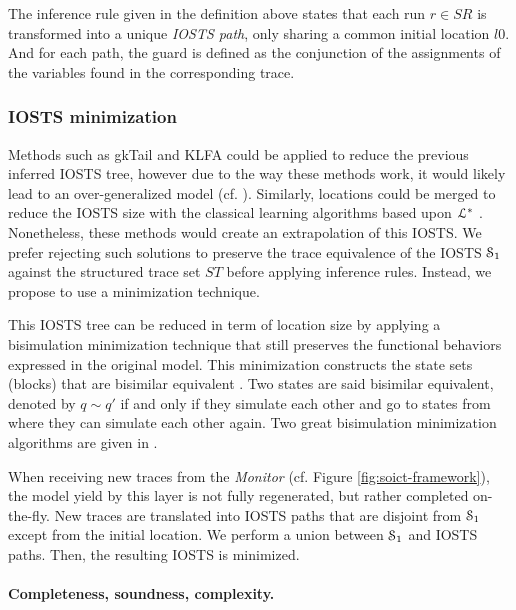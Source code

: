 The inference rule given in the definition above states that each
run $r \in SR$ is transformed into a unique \emph{IOSTS path},
only sharing a common initial location $l0$. And for each path,
the guard is defined as the conjunction of the assignments of the
variables found in the corresponding trace.

\subsubsection{IOSTS minimization}

Methods such as gkTail and KLFA could be applied to reduce the
previous inferred IOSTS tree, however due to the way these
methods work, it would likely lead to an over-generalized model
(cf. ).
Similarly, locations could be merged to reduce the IOSTS size
with the classical learning algorithms based upon
$\EuScript{L}^*$ \cite{Angluin198787,lambeau08}. Nonetheless,
these methods would create an extrapolation of this IOSTS. We
prefer rejecting such solutions to preserve the trace equivalence
\cite{petrenko06} of the IOSTS $\EuScript{S}_1$ against the
structured trace set $ST$ before applying inference rules.
Instead, we propose to use a minimization technique.

This IOSTS tree can be reduced in term of location size by
applying a bisimulation minimization technique that still
preserves the functional behaviors expressed in the original
model. This minimization constructs the state sets (blocks) that
are bisimilar equivalent \cite{Park:1981:CAI:647210.720030}. Two
states are said bisimilar equivalent, denoted by $q \sim q'$ if
and only if they simulate each other and go to states from where
they can simulate each other again.  Two great bisimulation
minimization algorithms are given in
\cite{Fernandez89animplementation,Abdulla06}.

When receiving new traces from the \emph{Monitor} (cf. Figure
\ref{fig:soict-framework}), the model yield by this layer is not
fully regenerated, but rather completed on-the-fly. New traces
are translated into IOSTS paths that are disjoint from
$\EuScript{S}_1$ except from the initial location. We perform a
union between $\EuScript{S}_1$ and IOSTS paths. Then, the
resulting IOSTS is minimized.

\paragraph{Completeness, soundness, complexity.}

